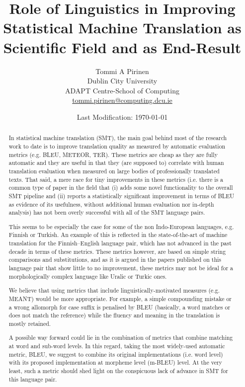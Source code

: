 \documentclass[a4paper]{article}
\title{Role of Linguistics in Improving Statistical Machine Translation as
Scientific Field and as End-Result}
\author{Tommi A Pirinen\\
Dublin City University\\
ADAPT Centre-School of Computing\\
\url{tommi.pirinen@computing.dcu.ie}}
\date{Last Modification: \today}
\begin{document}
\maketitle

\begin{abstract} 
    In statistical machine translation (SMT), the main goal behind
    most of the research work to date is to improve translation quality as
    measured by automatic evaluation metrics (e.g. BLEU, METEOR, TER). These
    metrics are cheap as they are fully automatic and they are useful in that
    they (are supposed to) correlate with human translation evaluation when
    measured on large bodies of professionally translated texts. That said, a
    mere race for tiny improvements in these metrics (i.e. there is a common
    type of paper in the field  that (i) adds some novel functionality to the
    overall SMT pipeline and (ii) reports a statistically significant
    improvement in terms of BLEU as evidence of its usefulness, without
    additional human evaluation nor in-depth analysis) has not been overly
    successful with all of the SMT language pairs.

    This seems to be especially the case for some of the non Indo-European
    languages, e.g. Finnish or Turkish.  An example of this is reflected in the
    state-of-the-art of machine translation for the Finnish–English language
    pair, which has not advanced in the past decade in terms of these metrics.
    These metrics however, are based on simple string comparisons and
    substitutions, and as it is argued in the papers published on this language
    pair that show little to no
    improvement\cite{clifton2011combining,luong2010hybrid,virpioja2007morphology},
    these metrics may not be ideal for a morphologically complex language like
    Uralic or Turkic ones.

    We believe that using metrics that include linguistically-motivated
    measures (e.g. MEANT\cite{lo2011meant}) would be more appropriate. For example, a simple
    compounding mistake or a wrong allomorph for case suffix is penalised by
    BLEU (basically, a word matches or does not match the reference) while the
    fluency and meaning in the translation is mostly retained.

    A possible way forward could lie in the combination of metrics that combine
    matching at word and sub-word levels. In this regard, taking the most
    widely-used automatic metric, BLEU, we suggest to combine its original
    implementations (i.e. word level) with its proposed implementation at
    morpheme level (m-BLEU\cite{luong2010hybrid}) level. At the very least,
    such a metric should shed light on the conspicuous lack of advance in SMT
    for this language pair.


\end{abstract}
\end{document}
